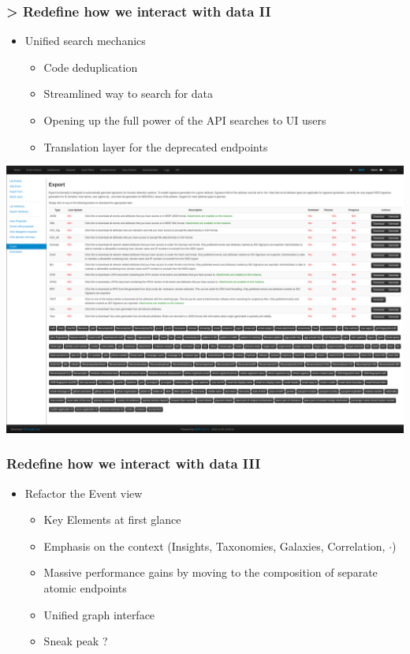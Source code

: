 \begin{frame}
    \frametitle{> Redefine how we interact with data II}
    \begin{itemize}
        \item Unified search mechanics
        \begin{itemize}
            \item Code deduplication
            \item Streamlined way to search for data
            \item Opening up the full power of the API searches to UI users
            \item Translation layer for the deprecated endpoints
        \end{itemize}
    \end{itemize}
    \begin{center}
        \includegraphics[width=0.7\linewidth]{pictures/misp-export.png}
    \end{center}
\end{frame}

\begin{frame}
    \frametitle{Redefine how we interact with data III}
    \begin{itemize}
        \item Refactor the Event view
        \begin{itemize}
            \item Key Elements at first glance
            \item Emphasis on the context (Insights, Taxonomies, Galaxies, Correlation, $\cdot$)
            \item Massive performance gains by moving to the composition of separate atomic endpoints
            \item Unified graph interface
            \item Sneak peak ? 
        \end{itemize}
    \end{itemize}
\end{frame}

